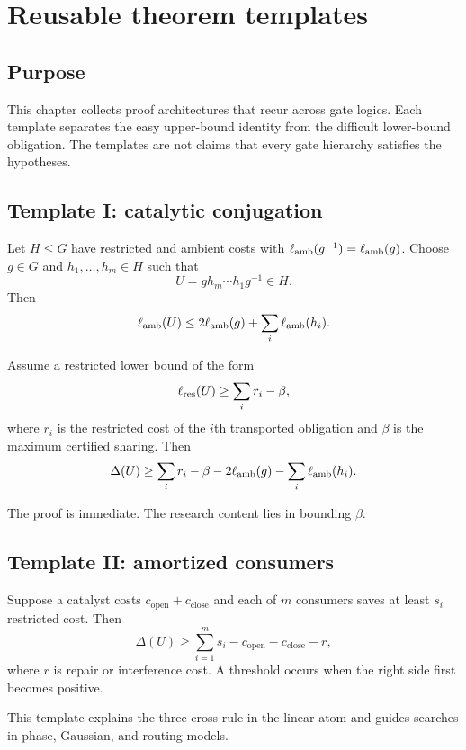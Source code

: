 \section{Reusable theorem templates}\label{g:ch:templates}


\subsection{Purpose}
This chapter collects proof architectures that recur across gate logics.  Each template separates the easy upper-bound identity from the difficult lower-bound obligation.  The templates are not claims that every gate hierarchy satisfies the hypotheses.

\subsection{Template I: catalytic conjugation}
Let $H\le G$ have restricted and ambient costs with $\ell_{\mathrm{amb}}(g^{-1})=\ell_{\mathrm{amb}}(g)$.  Choose $g\in G$ and $h_1,\ldots,h_m\in H$ such that
\[
U=g h_m\cdots h_1 g^{-1}\in H.
\]
Then
\[
\ell_{\mathrm{amb}}(U)
\le
2\ell_{\mathrm{amb}}(g)+\sum_i\ell_{\mathrm{amb}}(h_i).
\]

\begin{theorem}
Assume a restricted lower bound of the form
\[
\ell_{\mathrm{res}}(U)
\ge
\sum_i r_i-\beta,
\]
where $r_i$ is the restricted cost of the $i$th transported obligation and $\beta$ is the maximum certified sharing.  Then
\[
\Delta(U)
\ge
\sum_i r_i-\beta
-
2\ell_{\mathrm{amb}}(g)-\sum_i\ell_{\mathrm{amb}}(h_i).
\]
\end{theorem}

The proof is immediate.  The research content lies in bounding $\beta$.

\subsection{Template II: amortized consumers}
Suppose a catalyst costs $c_{\mathrm{open}}+c_{\mathrm{close}}$ and each of $m$ consumers saves at least $s_i$ restricted cost.  Then
\[
\Delta(U)
\ge
\sum_{i=1}^m s_i
-c_{\mathrm{open}}-c_{\mathrm{close}}-r,
\]
where $r$ is repair or interference cost.  A threshold occurs when the right side first becomes positive.

This template explains the three-cross rule in the linear atom and guides searches in phase, Gaussian, and routing models.

